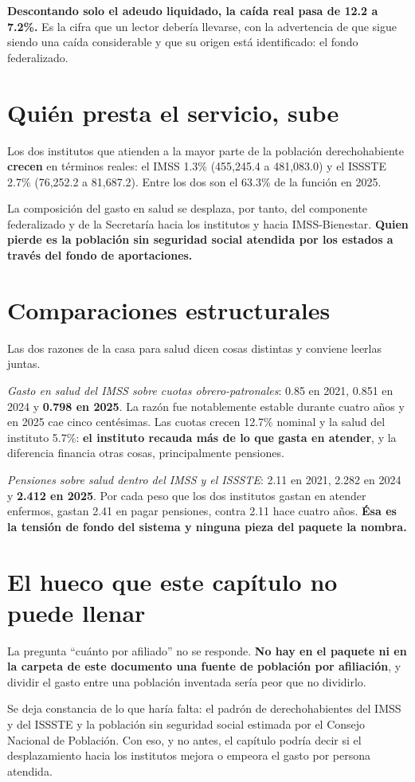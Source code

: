 \textbf{Descontando solo el adeudo liquidado, la caída real pasa de 12.2 a 7.2\%.}
Es la cifra que un lector debería llevarse, con la advertencia de que sigue siendo
una caída considerable y que su origen está identificado: el fondo federalizado.

\section{Quién presta el servicio, sube}

Los dos institutos que atienden a la mayor parte de la población derechohabiente
\textbf{crecen} en términos reales: el IMSS 1.3\% (455,245.4 a 481,083.0) y el
ISSSTE 2.7\% (76,252.2 a 81,687.2). Entre los dos son el 63.3\% de la función en
2025.

La composición del gasto en salud se desplaza, por tanto, del componente
federalizado y de la Secretaría hacia los institutos y hacia IMSS-Bienestar.
\textbf{Quien pierde es la población sin seguridad social atendida por los estados
a través del fondo de aportaciones.}

\section{Comparaciones estructurales}

Las dos razones de la casa para salud dicen cosas distintas y conviene leerlas
juntas.

\emph{Gasto en salud del IMSS sobre cuotas obrero-patronales}: 0.85 en 2021, 0.851
en 2024 y \textbf{0.798 en 2025}. La razón fue notablemente estable durante cuatro
años y en 2025 cae cinco centésimas. Las cuotas crecen 12.7\% nominal y la salud
del instituto 5.7\%: \textbf{el instituto recauda más de lo que gasta en atender},
y la diferencia financia otras cosas, principalmente pensiones.

\emph{Pensiones sobre salud dentro del IMSS y el ISSSTE}: 2.11 en 2021, 2.282 en
2024 y \textbf{2.412 en 2025}. Por cada peso que los dos institutos gastan en
atender enfermos, gastan 2.41 en pagar pensiones, contra 2.11 hace cuatro años.
\textbf{Ésa es la tensión de fondo del sistema y ninguna pieza del paquete la
nombra.}

\section{El hueco que este capítulo no puede llenar}

La pregunta ``cuánto por afiliado'' no se responde. \textbf{No hay en el paquete
ni en la carpeta de este documento una fuente de población por afiliación}, y
dividir el gasto entre una población inventada sería peor que no dividirlo.

Se deja constancia de lo que haría falta: el padrón de derechohabientes del IMSS y
del ISSSTE y la población sin seguridad social estimada por el Consejo Nacional de
Población. Con eso, y no antes, el capítulo podría decir si el desplazamiento
hacia los institutos mejora o empeora el gasto por persona atendida.

\clearpage
